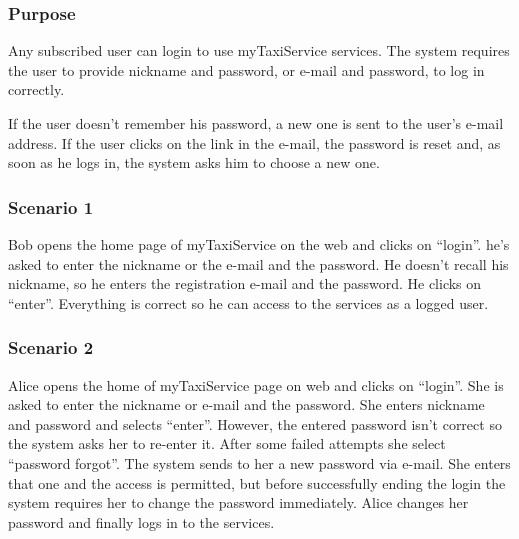 \label{user-login}
\subsubsection{Purpose}
Any subscribed user can login to use myTaxiService services.
The system requires the user to provide nickname and password, or e-mail and password, to log in correctly.

If the user doesn't remember his password, a new one is sent to the user's e-mail address. If the user clicks on the link in the e-mail, the password is reset and, as soon as he logs in, the system asks him to choose a new one. 



\subsubsection{Scenario 1}
Bob opens the home page of myTaxiService on the web and clicks on ``login''. 
he's asked to enter the nickname or the e-mail and the password. He doesn't recall his nickname, so he enters the registration e-mail and the password. He clicks on ``enter''. 
Everything is correct so he can access to the services as a logged user.

\subsubsection{Scenario 2}
Alice opens the home of myTaxiService page on web and clicks on ``login''.  
She is asked to enter the nickname or e-mail and the password.
She enters nickname and password and selects ``enter''. However, the entered password isn't correct so the system asks her to re-enter it. 
After some failed attempts she select ``password forgot''.
The system sends to her a new password via e-mail. She enters that one and the access is permitted, but before successfully ending the login the system requires her to change the password immediately. 
Alice changes her password and finally logs in to the services.

